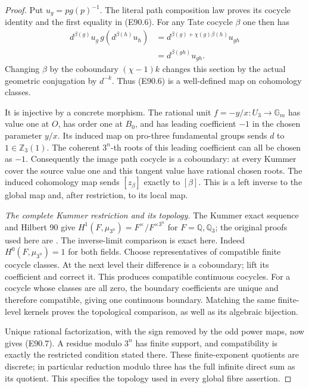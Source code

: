 \begin{proof}
Put $u_g=p g(p)^{-1}$. The literal path
composition law proves its cocycle identity
and the first equality in (E90.6). For any
Tate cocycle $\beta$ one then has
\[
 \begin{aligned}
 d^{\beta(g)}u_g\,g(d^{\beta(h)}u_h)
 &=d^{\beta(g)+\chi(g)\beta(h)}u_{gh}\\
 &=d^{\beta(gh)}u_{gh}.
 \end{aligned}
 \tag{E90.28}
\]
Changing $\beta$ by the coboundary
$(\chi-1)k$ changes this section by the
actual geometric conjugation by $d^{-k}$.
Thus (E90.6) is a well-defined map on
cohomology classes.

It is injective by a concrete morphism.
The rational unit $f=-y/x:U_3\to\mathbb G_m$
has value one at $O$, has order one at $B_0$,
and has leading coefficient $-1$ in the
chosen parameter $y/x$. Its induced map
on pro-three fundamental groups sends
$d$ to $1\in\mathbb Z_3(1)$. The coherent
$3^n$-th roots of this leading coefficient
can all be chosen as $-1$. Consequently the
image path cocycle is a coboundary: at
every Kummer cover the source value one
and this tangent value have rational
chosen roots. The induced cohomology map
sends $[z_\beta]$ exactly to $[\beta]$.
This is a left inverse to the global map
and, after restriction, to its local map.

\emph{The complete Kummer restriction and its topology.}
The Kummer exact sequence and Hilbert 90
give $H^1(F,\mu_{3^n})=F^\times/F^{\times3^n}$
for $F=\mathbb Q,\mathbb Q_3$; the original
proofs used here are \cite[II, Proposition1.22;
III, \S4, Step2]{E_MilneCFT}.
The inverse-limit comparison is exact here.
Indeed $H^0(F,\mu_{3^n})=1$ for both fields.
Choose representatives of compatible finite
cocycle classes. At the next level their
difference is a coboundary; lift its coefficient
and correct it. This produces compatible
continuous cocycles. For a cocycle whose
classes are all zero, the boundary coefficients
are unique and therefore compatible, giving
one continuous boundary. Matching the same
finite-level kernels proves the topological
comparison, as well as its algebraic bijection.

Unique rational factorization, with the sign
removed by the odd power maps, now gives
(E90.7). A residue modulo $3^n$ has finite
support, and compatibility is exactly the
restricted condition stated there. These
finite-exponent quotients are discrete;
in particular reduction modulo three has
the full infinite direct sum as its quotient.
This specifies the topology used in every
global fibre assertion.


\end{proof}

